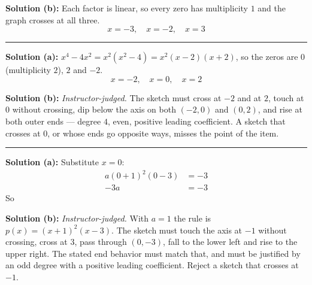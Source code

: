 \documentclass[12pt]{article}
\begin{document}
\textbf{Solution (b):} Each factor is linear, so every zero has multiplicity $1$ and the graph crosses at all three.
\[ \boxed{x = -3, \quad x = -2, \quad x = 3} \]

\vspace{0.1cm}\noindent\rule{\linewidth}{0.2pt}


\textbf{Solution (a):} $x^{4} - 4x^{2} = x^{2}\left(x^{2} - 4\right) = x^{2}(x-2)(x+2)$, so the zeros are $0$ (multiplicity $2$), $2$ and $-2$.
\[ \boxed{x = -2, \quad x = 0, \quad x = 2} \]

\textbf{Solution (b):} \emph{Instructor-judged.} The sketch must cross at $-2$ and at $2$, touch at $0$ without crossing, dip below the axis on both $(-2, 0)$ and $(0, 2)$, and rise at both outer ends --- degree $4$, even, positive leading coefficient. A sketch that crosses at $0$, or whose ends go opposite ways, misses the point of the item.

\vspace{0.1cm}\noindent\rule{\linewidth}{0.2pt}


\textbf{Solution (a):} Substitute $x = 0$:
\begin{align*}
  a(0+1)^{2}(0-3) &= -3 \\
  -3a &= -3
\end{align*}
So 

\textbf{Solution (b):} \emph{Instructor-judged.} With $a = 1$ the rule is $p(x) = (x+1)^{2}(x-3)$. The sketch must touch the axis at $-1$ without crossing, cross at $3$, pass through $(0, -3)$, fall to the lower left and rise to the upper right. The stated end behavior must match that, and must be justified by an odd degree with a positive leading coefficient. Reject a sketch that crosses at $-1$.
\end{document}
